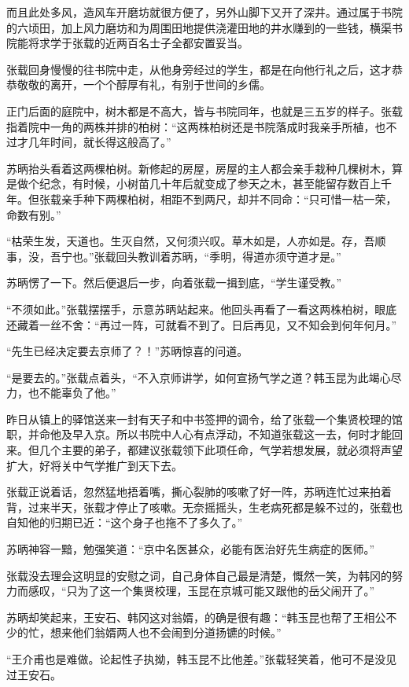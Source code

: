 而且此处多风，造风车开磨坊就很方便了，另外山脚下又开了深井。通过属于书院的六顷田，加上风力磨坊和为周围田地提供浇灌田地的井水赚到的一些钱，横渠书院能将求学于张载的近两百名士子全都安置妥当。

张载回身慢慢的往书院中走，从他身旁经过的学生，都是在向他行礼之后，这才恭恭敬敬的离开，一个个醇厚有礼，有别于世间的乡儒。

正门后面的庭院中，树木都是不高大，皆与书院同年，也就是三五岁的样子。张载指着院中一角的两株并排的柏树：“这两株柏树还是书院落成时我亲手所植，也不过才几年时间，就长得这般高了。”

苏昞抬头看着这两棵柏树。新修起的房屋，房屋的主人都会亲手栽种几棵树木，算是做个纪念，有时候，小树苗几十年后就变成了参天之木，甚至能留存数百上千年。但张载亲手种下两棵柏树，相距不到两尺，却并不同命：“只可惜一枯一荣，命数有别。”

“枯荣生发，天道也。生灭自然，又何须兴叹。草木如是，人亦如是。存，吾顺事，没，吾宁也。”张载回头教训着苏昞，“季明，得道亦须守道才是。”

苏昞愣了一下。然后便退后一步，向着张载一揖到底，“学生谨受教。”

“不须如此。”张载摆摆手，示意苏昞站起来。他回头再看了一看这两株柏树，眼底还藏着一丝不舍：“再过一阵，可就看不到了。日后再见，又不知会到何年何月。”

“先生已经决定要去京师了？！”苏昞惊喜的问道。

“是要去的。”张载点着头，“不入京师讲学，如何宣扬气学之道？韩玉昆为此竭心尽力，也不能辜负了他。”

昨日从镇上的驿馆送来一封有天子和中书签押的调令，给了张载一个集贤校理的馆职，并命他及早入京。所以书院中人心有点浮动，不知道张载这一去，何时才能回来。但几个主要的弟子，都建议张载领下此项任命，气学若想发展，就必须将声望扩大，好将关中气学推广到天下去。

张载正说着话，忽然猛地捂着嘴，撕心裂肺的咳嗽了好一阵，苏昞连忙过来拍着背，过来半天，张载才停止了咳嗽。无奈摇摇头，生老病死都是躲不过的，张载也自知他的归期已近：“这个身子也拖不了多久了。”

苏昞神容一黯，勉强笑道：“京中名医甚众，必能有医治好先生病症的医师。”

张载没去理会这明显的安慰之词，自己身体自己最是清楚，慨然一笑，为韩冈的努力而感叹，“只为了这一个集贤校理，玉昆在京城可能又跟他的岳父闹开了。”

苏昞却笑起来，王安石、韩冈这对翁婿，的确是很有趣：“韩玉昆也帮了王相公不少的忙，想来他们翁婿两人也不会闹到分道扬镳的时候。”

“王介甫也是难做。论起性子执拗，韩玉昆不比他差。”张载轻笑着，他可不是没见过王安石。

